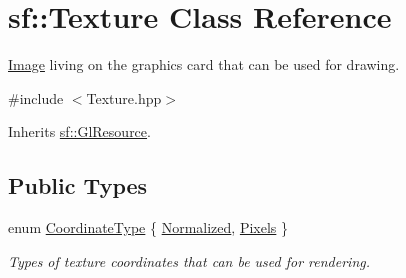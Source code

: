\hypertarget{classsf_1_1_texture}{\section{sf\+:\+:Texture Class Reference}
\label{classsf_1_1_texture}
}


\hyperlink{classsf_1_1_image}{Image} living on the graphics card that can be used for drawing.  




{\ttfamily \#include $<$Texture.\+hpp$>$}



Inherits \hyperlink{classsf_1_1_gl_resource}{sf\+::\+Gl\+Resource}.

\subsection*{Public Types}
\begin{DoxyCompactItemize}
\item 
enum \hyperlink{classsf_1_1_texture_aa6fd3bbe3c334b3c4428edfb2765a82e}{Coordinate\+Type} \{ \hyperlink{classsf_1_1_texture_aa6fd3bbe3c334b3c4428edfb2765a82ea69d6228950882e4d68be4ba4dbe7df73}{Normalized}, 
\hyperlink{classsf_1_1_texture_aa6fd3bbe3c334b3c4428edfb2765a82ea6372f9c3a10203a7a69d8d5da59d82ff}{Pixels}
 \}
\begin{DoxyCompactList}\small\item\em Types of texture coordinates that can be used for rendering. \end{DoxyCompactList}\end{DoxyCompactItemize}
